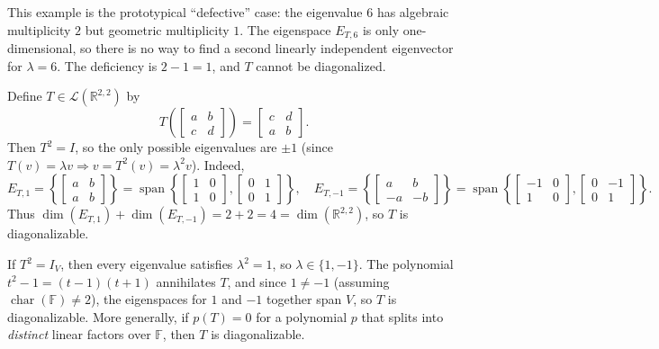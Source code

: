 This example is the prototypical ``defective'' case: the eigenvalue $6$ has algebraic multiplicity $2$ but geometric multiplicity $1$.
The eigenspace $E_{T,6}$ is only one-dimensional, so there is no way to find a second linearly independent eigenvector for $\lambda=6$.
The deficiency is $2-1=1$, and $T$ cannot be diagonalized.

\begin{examplebox}[title={Worked Example (Lecture Week 9): diagonalization on $\mathbb{R}^{2,2}$}]
Define $T\in\mathcal{L}(\mathbb{R}^{2,2})$ by
\[
T\!\left(\begin{bmatrix}a&b\\c&d\end{bmatrix}\right)=\begin{bmatrix}c&d\\a&b\end{bmatrix}.
\]
Then $T^2=I$, so the only possible eigenvalues are $\pm 1$ (since $T(v)=\lambda v\Rightarrow v=T^2(v)=\lambda^2 v$).
Indeed,
\[
E_{T,1}=\left\{\begin{bmatrix}a&b\\a&b\end{bmatrix}\right\}=\operatorname{span}\left\{
\begin{bmatrix}1&0\\1&0\end{bmatrix},
\begin{bmatrix}0&1\\0&1\end{bmatrix}
\right\},
\quad
E_{T,-1}=\left\{\begin{bmatrix}a&b\\-a&-b\end{bmatrix}\right\}=\operatorname{span}\left\{
\begin{bmatrix}-1&0\\1&0\end{bmatrix},
\begin{bmatrix}0&-1\\0&1\end{bmatrix}
\right\}.
\]
Thus $\dim(E_{T,1})+\dim(E_{T,-1})=2+2=4=\dim(\mathbb{R}^{2,2})$, so $T$ is diagonalizable.
\end{examplebox}

\begin{examtip}[title={Exam Focus: involutions ($T^2=I$) are always diagonalizable (over fields where $\operatorname{char}\neq 2$)}]
If $T^2=I_V$, then every eigenvalue satisfies $\lambda^2=1$, so $\lambda\in\{1,-1\}$.
The polynomial $t^2-1=(t-1)(t+1)$ annihilates $T$, and since $1\neq -1$ (assuming $\operatorname{char}(\mathbb{F})\neq 2$), the eigenspaces for $1$ and $-1$ together span $V$, so $T$ is diagonalizable.
More generally, if $p(T)=0$ for a polynomial $p$ that splits into \emph{distinct} linear factors over $\mathbb{F}$, then $T$ is diagonalizable.
\end{examtip}

